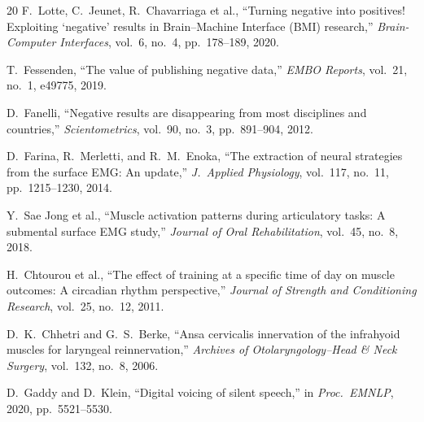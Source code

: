 \documentclass[11pt, a4paper]{article}
\begin{document}
\begin{thebibliography}{20}
F.\ Lotte, C.\ Jeunet, R.\ Chavarriaga et al., ``Turning negative into positives! Exploiting `negative' results in Brain--Machine Interface (BMI) research,'' \emph{Brain-Computer Interfaces}, vol.~6, no.~4, pp.\ 178--189, 2020.

T.\ Fessenden, ``The value of publishing negative data,'' \emph{EMBO Reports}, vol.~21, no.~1, e49775, 2019.

D.\ Fanelli, ``Negative results are disappearing from most disciplines and countries,'' \emph{Scientometrics}, vol.~90, no.~3, pp.\ 891--904, 2012.

D.\ Farina, R.\ Merletti, and R.~M.\ Enoka, ``The extraction of neural strategies from the surface EMG: An update,'' \emph{J.\ Applied Physiology}, vol.~117, no.~11, pp.\ 1215--1230, 2014.

Y.\ Sae Jong et al., ``Muscle activation patterns during articulatory tasks: A submental surface EMG study,'' \emph{Journal of Oral Rehabilitation}, vol.\ 45, no.\ 8, 2018.

H.\ Chtourou et al., ``The effect of training at a specific time of day on muscle outcomes: A circadian rhythm perspective,'' \emph{Journal of Strength and Conditioning Research}, vol.\ 25, no.\ 12, 2011.

D.~K.\ Chhetri and G.~S.\ Berke, ``Ansa cervicalis innervation of the infrahyoid muscles for laryngeal reinnervation,'' \emph{Archives of Otolaryngology--Head \& Neck Surgery}, vol.\ 132, no.\ 8, 2006.

D.\ Gaddy and D.\ Klein, ``Digital voicing of silent speech,'' in \emph{Proc.\ EMNLP}, 2020, pp.\ 5521--5530.

\end{thebibliography}
\end{document}
